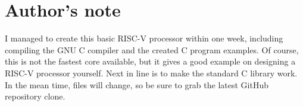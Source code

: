 \documentclass[12pt]{article}
\begin{document}
\section{Author's note}
I managed to create this basic RISC-V processor within one week, including compiling the GNU C compiler and the created C program examples. Of course, this is not the fastest core available, but it gives a good example on designing a RISC-V processor yourself. Next in line is to make the standard C library work. In the mean time, files will change, so be sure to grab the latest GitHub repository clone.
\end{document}

